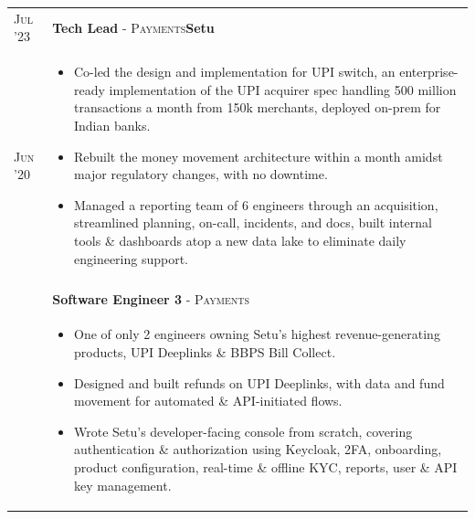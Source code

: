 \documentclass[a4paper,10pt]{extarticle} %
\begin{document}
\begin{tabularx}{\linewidth}{l | X}
\textsc{Jul '23} & \textbf{Tech Lead} \textsc{- Payments}\hfill\raisebox{-.2\height}{ \hspace{0.3em}}\textbf{Setu}\\
\textsc{Jun '20} & \begin{itemize}[leftmargin=*, nosep, before=\vspace{-1.0\baselineskip}, after=\vspace{-1.6\baselineskip}]
  \item Co-led the design and implementation for UPI switch, an enterprise-ready implementation of the UPI acquirer spec handling 500 million transactions a month from 150k merchants, deployed on-prem for Indian banks.
  \item Rebuilt the money movement architecture within a month amidst major regulatory changes, with no downtime.
  \item Managed a reporting team of 6 engineers through an acquisition, streamlined planning, on-call, incidents, and docs, built internal tools \& dashboards atop a new data lake to eliminate daily engineering support.
\end{itemize}\\\\
& \textbf{Software Engineer 3} \textsc{- Payments}\\
& \begin{itemize}[leftmargin=*, nosep, before=\vspace{-1.0\baselineskip}, after=\vspace{-1.0\baselineskip}]
  \item One of only 2 engineers owning Setu's highest revenue-generating products, UPI Deeplinks \& BBPS Bill Collect.
  \item Designed and built refunds on UPI Deeplinks, with data and fund movement for automated \& API-initiated flows.
  \item Wrote Setu's developer-facing console from scratch, covering authentication \& authorization using Keycloak, 2FA, onboarding, product configuration, real-time \& offline KYC, reports, user \& API key management.

\end{itemize}
\end{tabularx}
\end{document}
